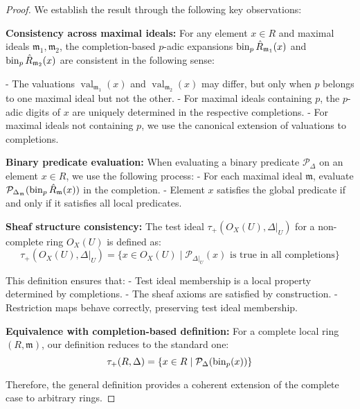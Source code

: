 \begin{proof}
We establish the result through the following key observations:

\textbf{Consistency across maximal ideals:} For any element $x \in R$ and maximal ideals $\mathfrak{m}_1, \mathfrak{m}_2$, the completion-based $p$-adic expansions $\operatorname{bin}_p{\hat{R}_{\mathfrak{m}_1}}(x)$ and $\operatorname{bin}_p{\hat{R}_{\mathfrak{m}_2}}(x)$ are consistent in the following sense:

- The valuations $\operatorname{val}_{\mathfrak{m}_1}(x)$ and $\operatorname{val}_{\mathfrak{m}_2}(x)$ may differ, but only when $p$ belongs to one maximal ideal but not the other.
- For maximal ideals containing $p$, the $p$-adic digits of $x$ are uniquely determined in the respective completions.
- For maximal ideals not containing $p$, we use the canonical extension of valuations to completions.

\textbf{Binary predicate evaluation:} When evaluating a binary predicate $\mathcal{P}_{\Delta}$ on an element $x \in R$, we use the following process:
- For each maximal ideal $\mathfrak{m}$, evaluate $\mathcal{P}_{\Delta_{\mathfrak{m}}}(\operatorname{bin}_p{\hat{R}_\mathfrak{m}}(x))$ in the completion.
- Element $x$ satisfies the global predicate if and only if it satisfies all local predicates.

\textbf{Sheaf structure consistency:} The test ideal $\tau_+(O_X(U),\Delta|_U)$ for a non-complete ring $O_X(U)$ is defined as:
$$\tau_+(O_X(U),\Delta|_U) = \{x \in O_X(U) \mid \mathcal{P}_{\Delta|_U}(x) \text{ is true in all completions}\}$$

This definition ensures that:
- Test ideal membership is a local property determined by completions.
- The sheaf axioms are satisfied by construction.
- Restriction maps behave correctly, preserving test ideal membership.

\textbf{Equivalence with completion-based definition:} For a complete local ring $(R, \mathfrak{m})$, our definition reduces to the standard one:
$$\tau_+(R,\Delta) = \{x \in R \mid \mathcal{P}_{\Delta}(\operatorname{bin}_p(x))\}$$

Therefore, the general definition provides a coherent extension of the complete case to arbitrary rings.
\end{proof}

